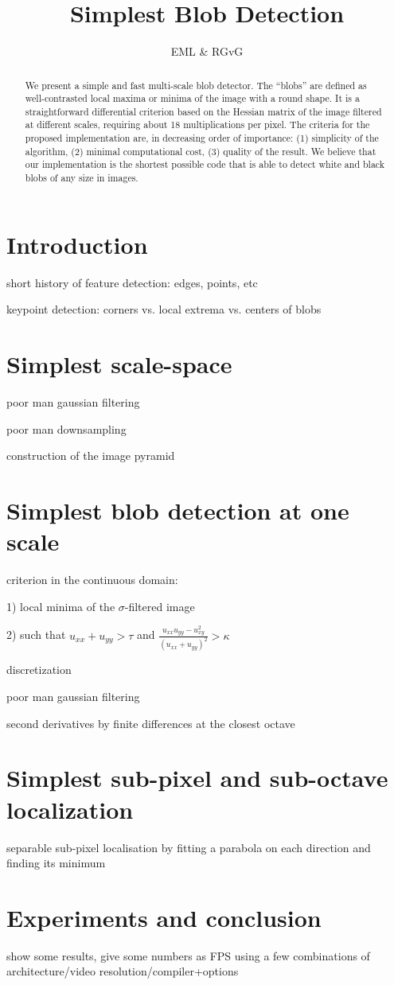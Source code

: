 \documentclass[a4paper]{article}
\title{Simplest Blob Detection}
\author{EML \& RGvG}
\begin{document}
\maketitle
\begin{abstract}
	We present a simple and fast multi-scale blob detector.
	The ``blobs'' are defined as well-contrasted local maxima or minima of
	the image with a round shape.
	It is a straightforward differential criterion based on the Hessian
	matrix of the image filtered at different scales, requiring about 18
	multiplications per pixel.
	The criteria for the proposed implementation are, in decreasing order
	of importance: (1) simplicity of the algorithm, (2) minimal
	computational cost, (3) quality of the result.
	We believe that our implementation is the shortest possible code that
	is able to detect white and black blobs of any size in images.
\end{abstract}

\section{Introduction}

short history of feature detection: edges, points, etc

keypoint detection: corners vs. local extrema vs. centers of blobs

\section{Simplest scale-space}

poor man gaussian filtering

poor man downsampling

construction of the image pyramid

\section{Simplest blob detection at one scale}

criterion in the continuous domain:

1) local minima of the $\sigma$-filtered image

2) such that $u_{xx}+u_{yy} > \tau$ and
$\frac{u_{xx}u_{yy}-u_{xy}^2}{(u_{xx}+u_{yy})^2}>\kappa$

discretization

poor man gaussian filtering

second derivatives by finite differences at the closest octave


\section{Simplest sub-pixel and sub-octave localization}

separable sub-pixel localisation by fitting a parabola on each direction and
finding its minimum

\section{Experiments and conclusion}

show some results, give some numbers as FPS using a few combinations of
architecture/video resolution/compiler+options
\end{document}
